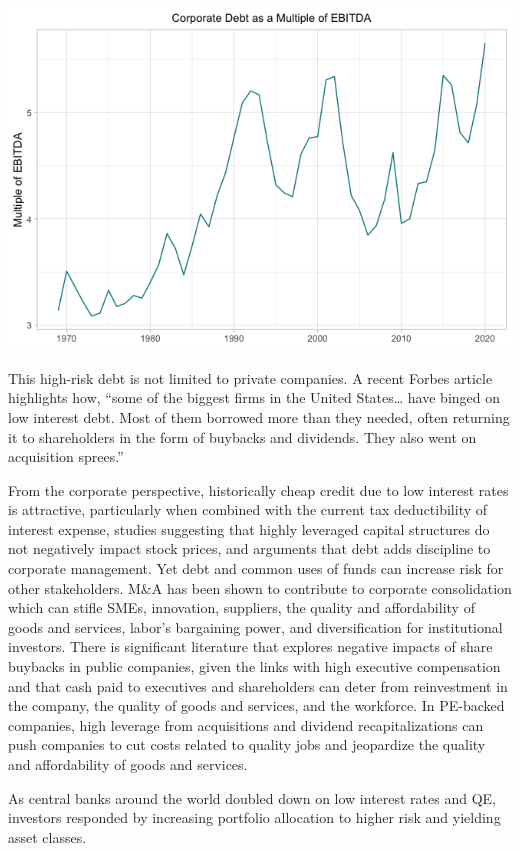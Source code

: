 \documentclass[
]{book}
\begin{document}
\includegraphics{fig/corporate_debt_ebitda.png}

This high-risk debt is not limited to private companies. A recent Forbes article highlights how, ``some of
the biggest firms in the United States\ldots{} have binged on low interest debt. Most of them borrowed more
than they needed, often returning it to shareholders in the form of buybacks and dividends. They also
went on acquisition sprees.''

From the corporate perspective, historically cheap credit due to low interest rates is attractive,
particularly when combined with the current tax deductibility of interest expense, studies suggesting
that highly leveraged capital structures do not negatively impact stock prices, and arguments that debt
adds discipline to corporate management. Yet debt and common uses of funds can increase risk for
other stakeholders. M\&A has been shown to contribute to corporate consolidation which can stifle
SMEs, innovation, suppliers, the quality and affordability of goods and services, labor's bargaining
power, and diversification for institutional investors. There is significant literature that explores
negative impacts of share buybacks in public companies, given the links with high executive
compensation and that cash paid to executives and shareholders can deter from reinvestment in the
company, the quality of goods and services, and the workforce. In PE-backed companies, high leverage
from acquisitions and dividend recapitalizations can push companies to cut costs related to quality jobs
and jeopardize the quality and affordability of goods and services.

As central banks around the world doubled down on low interest rates and QE, investors responded by
increasing portfolio allocation to higher risk and yielding asset classes.
\end{document}
